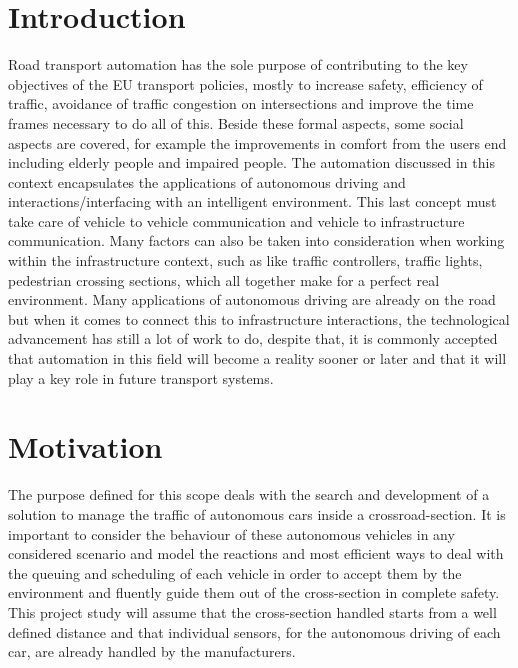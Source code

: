 \documentclass[conference]{IEEEtran}
\begin{document}
\section{Introduction}
Road transport automation has the sole purpose of contributing to the key objectives of the EU transport policies, mostly to increase safety, efficiency of traffic, avoidance of traffic congestion on intersections and improve the time frames necessary to do all of this. Beside these formal aspects, some social aspects are covered, for example the improvements in comfort from the users end including elderly people and impaired people.
The automation discussed in this context encapsulates the applications of autonomous driving and interactions/interfacing with an intelligent environment. This last concept must take care of vehicle to vehicle communication and vehicle to infrastructure communication. Many factors can also be taken into consideration when working within the infrastructure context, such as like traffic controllers, traffic lights, pedestrian crossing sections, which all together make for a perfect real environment. Many applications of autonomous driving are already on the road but when it comes to connect this to infrastructure interactions, the technological advancement has still a lot of work to do, despite that, it is commonly accepted that automation in this field will become a reality sooner or later and that it will play a key role in future transport systems. 

\section{Motivation}
The purpose defined for this scope deals with the search and development of a solution to manage the traffic of autonomous cars inside a crossroad-section. It is important to consider the behaviour of these autonomous vehicles in any considered scenario and model the reactions and most efficient ways to deal with the queuing and scheduling of each vehicle in order to accept them by the environment and fluently guide them out of the cross-section in complete safety. This project study will assume that the cross-section handled starts from a well defined distance and that individual sensors, for the autonomous driving of each car, are already handled by the manufacturers. 
\end{document}
